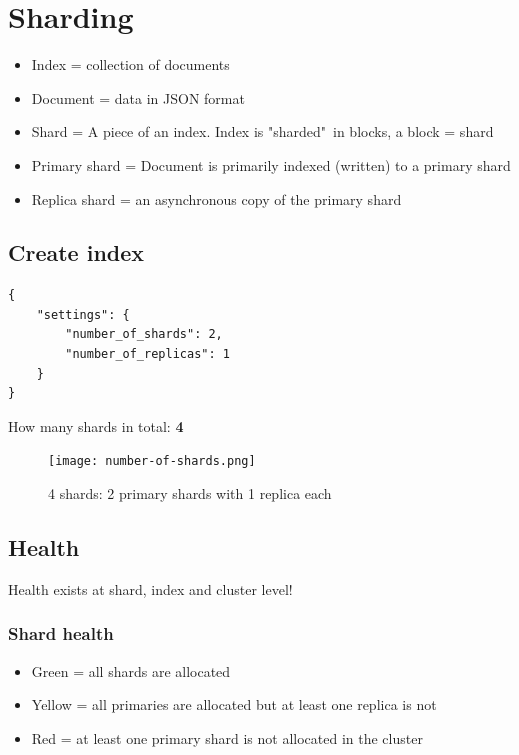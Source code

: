 \documentclass{article}
\begin{document}
\section{Sharding}

\begin{itemize}
    \item Index = collection of documents
    \item Document = data in JSON format
    \item Shard = A piece of an index. Index is "sharded"\ in blocks, a block = shard
    \item Primary shard = Document is primarily indexed (written) to a primary shard
    \item Replica shard = an asynchronous copy of the primary shard
\end{itemize}

\subsection{Create index}

\begin{verbatim}
{
    "settings": {
        "number_of_shards": 2,
        "number_of_replicas": 1
    }
}
\end{verbatim}

How many shards in total: \textbf{4}

\begin{figure}[H]
    \centering
    \texttt{[image: number-of-shards.png]}
    \caption{4 shards: 2 primary shards with 1 replica each}
\end{figure}

\subsection{Health}

Health exists at shard, index and cluster level!

\subsubsection{Shard health}

\begin{itemize}
    \item Green = all shards are allocated
    \item Yellow = all primaries are allocated but at least one replica is not
    \item Red = at least one primary shard is not allocated in the cluster
\end{itemize}
\end{document}
